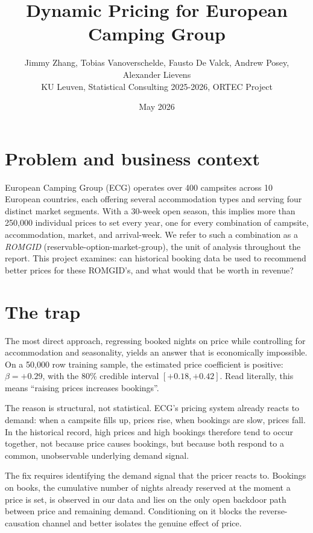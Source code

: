 \documentclass[11pt,a4paper]{article}
\title{Dynamic Pricing for European Camping Group}
\author{Jimmy Zhang, Tobias Vanoverschelde, Fausto De Valck, Andrew Posey, 
Alexander Lievens \\ KU Leuven, Statistical Consulting 2025-2026, ORTEC Project}
\date{May 2026}
\begin{document}
\maketitle

\section{Problem and business context}

European Camping Group (ECG) operates over 400 campsites across 10 European countries, each offering several accommodation types and serving four distinct market segments. With a 30-week open season, this implies more than 250{,}000 individual prices to set every year, one for every combination of campsite, accommodation, market, and arrival-week. We refer to such a combination as a \emph{ROMGID} (reservable-option-market-group), the unit of analysis throughout the report. This project examines: can historical booking data be used to recommend better prices for these ROMGID's, and what would that be worth in revenue?

\section{The trap}

The most direct approach, regressing booked nights on price while controlling for accommodation and seasonality, yields an answer that is economically impossible. On a 50{,}000 row training sample, the estimated price coefficient is positive: $\beta = +0.29$, with the 80\% credible interval $[+0.18, +0.42]$. Read literally, this means ``raising prices increases bookings''.

The reason is structural, not statistical. ECG's pricing system already reacts to demand: when a campsite fills up, prices rise, when bookings are slow, prices fall. In the historical record, high prices and high bookings therefore tend to occur together, not because price causes bookings, but because both respond to a common, unobservable underlying demand signal.

The fix requires identifying the demand signal that the pricer reacts to. Bookings on books, the cumulative number of nights already reserved at the moment a price is set, is observed in our data and lies on the only open backdoor path between price and remaining demand. Conditioning on it blocks the reverse-causation channel and better isolates the genuine effect of price.
\end{document}
